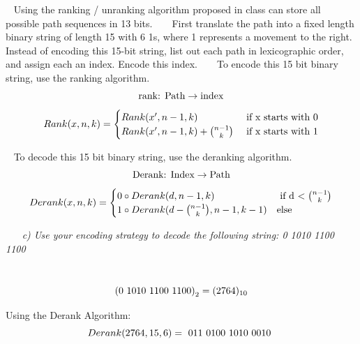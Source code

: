 \documentclass[12pt, letterpaper]{article}
\begin{document}
\-\ \newline
\textnormal{ Using the ranking / unranking algorithm proposed in class can store all possible path sequences in 13 bits.  }
\-\ \newline
\-\ \newline
\textnormal{ First translate the path into a fixed length binary string of length 15 with 6 1s, where 1 represents a movement to the right. Instead of encoding this 15-bit string, list out each path in lexicographic order, and assign each an index. Encode this index.  }
\-\ \newline
\-\ \newline
\textnormal{ To encode this 15 bit binary string, use the ranking algorithm. }
\[\textnormal{rank: Path} \rightarrow \textnormal{index} \]
\[ Rank(x, n, k) = \begin{cases} 
      Rank( x', n-1, k ) & \textnormal{ if x starts with 0} \\
      Rank( x', n-1, k ) + {n - 1 \choose k} & \textnormal{ if x starts with 1}
   \end{cases}
\]

\-\ \newline
\textnormal{To decode this 15 bit binary string, use the deranking algorithm.}
\[ \textnormal{Derank: Index} \rightarrow \textnormal{Path} \]
\[ Derank(x, n, k) = \begin{cases}
    0 \circ Derank(d, n-1, k) & \textnormal{ if d \(< {n - 1 \choose k}\)} \\
    1 \circ Derank(d - {n-1 \choose k}, n-1, k-1) & \textnormal{else}
\end{cases}
\]




\-\ \newline
\-\ \it{ c) Use your encoding strategy to decode the following string: 0 1010 1100 1100 }

\-\ \newline
\[ \textnormal{(0 1010 1100 1100)}_2 = (2764)_{10} \]

\textnormal{Using the Derank Algorithm:}
\[ Derank( 2764, 15, 6 ) = \textnormal{ 011 0100 1010 0010 } \]
\end{document}
